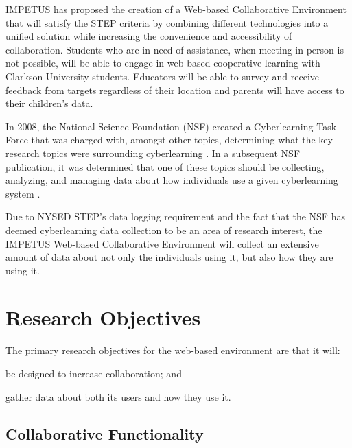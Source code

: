 \documentclass[11pt,letterpaper]{article}
\begin{document}
\begin{doublespacing}
IMPETUS has proposed the creation of a Web-based Collaborative Environment that will satisfy the STEP criteria by combining different technologies into a unified solution while increasing the convenience and accessibility of collaboration. Students who are in need of assistance, when meeting in-person is not possible, will be able to engage in web-based cooperative learning with Clarkson University students. Educators will be able to survey and receive feedback from targets regardless of their location and parents will have access to their children's data.

In 2008, the National Science Foundation (NSF) created a Cyberlearning Task Force that was charged with, amongst other topics, determining what the key research topics were surrounding cyberlearning \cite{nsf-taskforce}. In a subsequent NSF publication, it was determined that one of these topics should be collecting, analyzing, and managing data about how individuals use a given cyberlearning system \cite{nsf-cyberlearning}.

Due to NYSED STEP's data logging requirement and the fact that the NSF has deemed cyberlearning data collection to be an area of research interest, the IMPETUS Web-based Collaborative Environment will collect an extensive amount of data about not only the individuals using it, but also how they are using it.

\end{doublespacing}

\section{Research Objectives}

\begin{doublespacing}

The primary research objectives for the web-based environment are that it will:
\begin{inparaenum}[\itshape 1\upshape)]
\item be designed to increase collaboration; and
\item gather data about both its users and how they use it.
\end{inparaenum}

\end{doublespacing}

\subsection{Collaborative Functionality}
\end{document}

